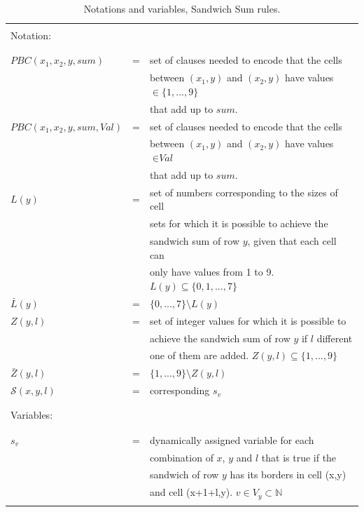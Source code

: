 \begin{table}
    \centering
    \begin{tabular}{l c l}
    \hline
    \\
    Notation: &&\\
    \\
    \hline
    \\
    $PBC(x_1,x_2,y,sum)$    &= &set of clauses needed to encode that the cells\\
                            &  &between $(x_1,y)$ and $(x_2,y)$ have values $\in \{1,...,9\}$\\
                            &  & that add up to $sum$.\\
    $PBC(x_1,x_2,y,sum,Val)$&= &set of clauses needed to encode that the cells\\
                            &  &between $(x_1,y)$ and $(x_2,y)$ have values $\in \textit{Val}$\\
                            &  &that add up to $sum$.\\
    $L(y)$                  &= &set of numbers corresponding to the sizes of cell\\
                            &  &sets for which it is possible to achieve the\\
                            &  &sandwich sum of row $y$, given that each cell can\\
                            &  &only have values from 1 to 9. $L(y)\subseteq \{0,1,...,7\}$\\
    $\bar{L}(y)$            &= &$\{0,...,7\}\setminus L(y)$\\
    $Z(y,l)$                &= &set of integer values for which it is possible to\\
                            &  &achieve the sandwich sum of row $y$ if $l$ different\\
                            &  &one of them are added.  $Z(y,l)\subseteq \{1,...,9\}$\\
    $\bar{Z}(y,l)$          &= &$\{1,...,9\}\setminus Z(y,l)$\\
    $\mathcal{S}(x,y,l)$    &= &corresponding $s_v$\\
    \\
    \hline
    \\
    Variables:&&\\
    \\
    \hline
    \\
    $s_v$                   &= &dynamically assigned variable for each\\
                            &  &combination of $x$, $y$ and $l$ that is true if the\\
                            &  &sandwich of row $y$ has its borders in cell (x,y)\\
                            &  &and cell (x+1+l,y). $v \in V_y \subset \mathbb{N}$\\
    \\    
    \hline
    \end{tabular}
    \caption{Notations and variables, Sandwich Sum rules.}
    \label{notation:SandwichSum}
\end{table}




